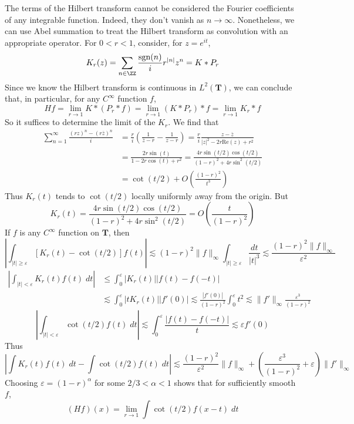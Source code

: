 The terms of the Hilbert transform cannot be considered the Fourier coefficients of any integrable function. Indeed, they don't vanish as $n \to \infty$. Nonetheless, we can use Abel summation to treat the Hilbert transform as convolution with an appropriate operator. For $0 < r < 1$, consider, for $z = e^{it}$,
%
\[ K_r(z) = \sum_{n \in \ZZ} \frac{\text{sgn}(n)}{i} r^{|n|} z^n = K * P_r \]
%
Since we know the Hilbert transform is continuous in $L^2(\mathbf{T})$, we can conclude that, in particular, for any $C^\infty$ function $f$,
%
\[ H f = \lim_{r \to 1} K * (P_r * f) = \lim_{r \to 1} (K * P_r) * f = \lim_{r \to 1} K_r * f \]
%
So it suffices to determine the limit of the $K_r$. We find that
%
\begin{align*}
    \sum_{n = 1}^\infty \frac{(rz)^n - (r \overline{z})^n}{i} &= \frac{r}{i} \left( \frac{1}{\overline{z} - r} - \frac{1}{z - r} \right) = \frac{r}{i} \frac{z - \overline{z}}{|z|^2 - 2r \text{Re}(z) + r^2}\\
    &= \frac{2r \sin(t)}{1 - 2r \cos(t) + r^2} = \frac{4r \sin(t/2) \cos(t/2)}{(1 - r)^2 + 4r \sin^2(t/2)}\\
    &= \cot(t/2) + O \left( \frac{(1 - r)^2}{t^3} \right)
\end{align*}
%
Thus $K_r(t)$ tends to $\cot(t/2)$ locally uniformly away from the origin. But
%
\[ K_r(t) = \frac{4r \sin(t/2) \cos(t/2)}{(1 - r)^2 + 4r\sin^2(t/2)} = O \left( \frac{t}{(1 - r)^2} \right) \]
%
If $f$ is any $C^\infty$ function on $\mathbf{T}$, then
%
\[ \left| \int_{|t| \geq \varepsilon} [K_r(t) - \cot(t/2)] f(t) \right| \lesssim (1 - r)^2 \| f \|_\infty \int_{|t| \geq \varepsilon} \frac{dt}{|t|^3} \lesssim \frac{(1 - r)^2 \| f \|_\infty}{\varepsilon^2} \]
%
\begin{align*}
    \left| \int_{|t| < \varepsilon} K_r(t) f(t)\; dt \right| &\leq \int_0^\varepsilon |K_r(t)||f(t) - f(-t)|\\
    &\lesssim \int_0^\varepsilon |tK_r(t)||f'(0)| \lesssim \frac{|f'(0)|}{(1 - r)^2} \int_0^\varepsilon t^2 \lesssim \| f' \|_\infty \frac{\varepsilon^3}{(1 - r)^2}
\end{align*}
%
\[ \left| \int_{|t| < \varepsilon} \cot(t/2) f(t)\; dt \right| \lesssim \int_0^\varepsilon \frac{|f(t) - f(-t)|}{t} \lesssim \varepsilon f'(0) \]
%
Thus
%
\[ \left| \int K_r(t) f(t)\; dt - \int \cot(t/2) f(t)\; dt \right| \lesssim \frac{(1 - r)^2}{\varepsilon^2} \| f \|_\infty + \left( \frac{\varepsilon^3}{(1 - r)^2} + \varepsilon \right) \| f' \|_\infty \]
%
Choosing $\varepsilon = (1 - r)^\alpha$ for some $2/3 < \alpha < 1$ shows that for sufficiently smooth $f$,
%
\[ (Hf)(x) = \lim_{r \to 1} \int \cot(t/2) f(x - t)\; dt \]



